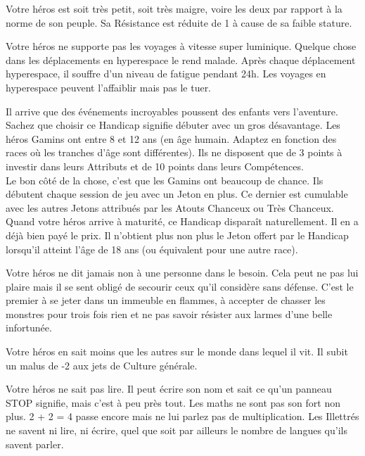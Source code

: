 \begin{description}[align=left]
    \item [Frêle (Majeur)]
        Votre héros est soit très petit, soit très maigre, voire les deux par rapport à la norme de son peuple. Sa Résistance est réduite de 1 à cause de sa faible stature.

    \item [Mal de l’espace (Mineur)]
        Votre héros ne supporte pas les voyages à vitesse super luminique. Quelque chose dans les déplacements en hyperespace le rend malade. Après chaque déplacement hyperespace, il souffre d’un niveau de fatigue pendant 24h. Les voyages en hyperespace peuvent l’affaiblir mais pas le tuer.

    \item [Gamin (Majeur)]
        Il arrive que des événements incroyables poussent des enfants vers l’aventure. Sachez que choisir ce Handicap signifie débuter avec un gros désavantage. Les héros Gamins ont entre 8 et 12 ans (en âge humain. Adaptez en fonction des races où les tranches d’âge sont différentes). Ils ne disposent que de 3 points à investir dans leurs Attributs et de 10 points dans leurs Compétences.\\
        Le bon côté de la chose, c’est que les Gamins ont beaucoup de chance. Ils débutent chaque session de jeu avec un Jeton en plus. Ce dernier est cumulable avec les autres Jetons attribués par les Atouts Chanceux ou Très Chanceux. Quand votre héros arrive à maturité, ce Handicap disparaît naturellement. Il en a déjà bien payé le prix. Il n’obtient plus non plus le Jeton offert par le Handicap lorsqu’il atteint l’âge de 18 ans (ou équivalent pour une autre race).

    \item [Héroïque (Majeur)]
        Votre héros ne dit jamais non à une personne dans le besoin. Cela peut ne pas lui plaire mais il se sent obligé de secourir ceux qu’il considère sans défense. C’est le premier à se jeter dans un immeuble en flammes, à accepter de chasser les monstres pour trois fois rien et ne pas savoir résister aux larmes d’une belle infortunée.

    \item [Ignorant (Majeur)]
        Votre héros en sait moins que les autres sur le monde dans lequel il vit. Il subit un malus de -2 aux jets de Culture générale.

    \item [Illettré (Mineur)]
        Votre héros ne sait pas lire. Il peut écrire son nom et sait ce qu’un panneau STOP signifie, mais c’est à peu près tout. Les maths ne sont pas son fort non plus. 2 + 2 = 4 passe encore mais ne lui parlez pas de multiplication. Les Illettrés ne savent ni lire, ni écrire, quel que soit par ailleurs le nombre de langues qu’ils savent parler.


\end{description}
